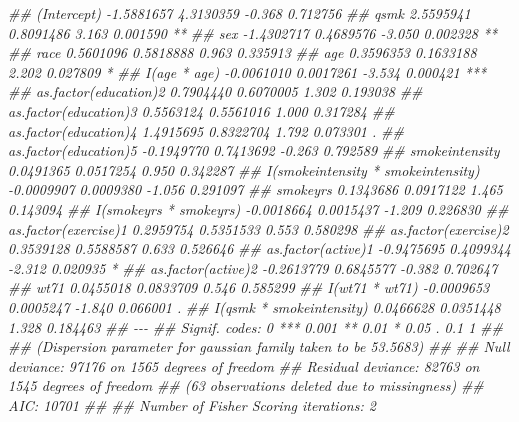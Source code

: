 \documentclass[
  10pt,
  a4paper,
]{book}
\newenvironment{Shaded}{\begin{snugshade}}{\end{snugshade}}
\newcommand{\DocumentationTok}[1]{\textcolor[rgb]{0.37,0.37,0.37}{\textit{#1}}}
\begin{document}
\begin{Shaded}
\begin{Highlighting}[]
\DocumentationTok{\#\# (Intercept)                        {-}1.5881657  4.3130359  {-}0.368 0.712756    }
\DocumentationTok{\#\# qsmk                                2.5595941  0.8091486   3.163 0.001590 ** }
\DocumentationTok{\#\# sex                                {-}1.4302717  0.4689576  {-}3.050 0.002328 ** }
\DocumentationTok{\#\# race                                0.5601096  0.5818888   0.963 0.335913    }
\DocumentationTok{\#\# age                                 0.3596353  0.1633188   2.202 0.027809 *  }
\DocumentationTok{\#\# I(age * age)                       {-}0.0061010  0.0017261  {-}3.534 0.000421 ***}
\DocumentationTok{\#\# as.factor(education)2               0.7904440  0.6070005   1.302 0.193038    }
\DocumentationTok{\#\# as.factor(education)3               0.5563124  0.5561016   1.000 0.317284    }
\DocumentationTok{\#\# as.factor(education)4               1.4915695  0.8322704   1.792 0.073301 .  }
\DocumentationTok{\#\# as.factor(education)5              {-}0.1949770  0.7413692  {-}0.263 0.792589    }
\DocumentationTok{\#\# smokeintensity                      0.0491365  0.0517254   0.950 0.342287    }
\DocumentationTok{\#\# I(smokeintensity * smokeintensity) {-}0.0009907  0.0009380  {-}1.056 0.291097    }
\DocumentationTok{\#\# smokeyrs                            0.1343686  0.0917122   1.465 0.143094    }
\DocumentationTok{\#\# I(smokeyrs * smokeyrs)             {-}0.0018664  0.0015437  {-}1.209 0.226830    }
\DocumentationTok{\#\# as.factor(exercise)1                0.2959754  0.5351533   0.553 0.580298    }
\DocumentationTok{\#\# as.factor(exercise)2                0.3539128  0.5588587   0.633 0.526646    }
\DocumentationTok{\#\# as.factor(active)1                 {-}0.9475695  0.4099344  {-}2.312 0.020935 *  }
\DocumentationTok{\#\# as.factor(active)2                 {-}0.2613779  0.6845577  {-}0.382 0.702647    }
\DocumentationTok{\#\# wt71                                0.0455018  0.0833709   0.546 0.585299    }
\DocumentationTok{\#\# I(wt71 * wt71)                     {-}0.0009653  0.0005247  {-}1.840 0.066001 .  }
\DocumentationTok{\#\# I(qsmk * smokeintensity)            0.0466628  0.0351448   1.328 0.184463    }
\DocumentationTok{\#\# {-}{-}{-}}
\DocumentationTok{\#\# Signif. codes:  0 \textquotesingle{}***\textquotesingle{} 0.001 \textquotesingle{}**\textquotesingle{} 0.01 \textquotesingle{}*\textquotesingle{} 0.05 \textquotesingle{}.\textquotesingle{} 0.1 \textquotesingle{} \textquotesingle{} 1}
\DocumentationTok{\#\# }
\DocumentationTok{\#\# (Dispersion parameter for gaussian family taken to be 53.5683)}
\DocumentationTok{\#\# }
\DocumentationTok{\#\#     Null deviance: 97176  on 1565  degrees of freedom}
\DocumentationTok{\#\# Residual deviance: 82763  on 1545  degrees of freedom}
\DocumentationTok{\#\#   (63 observations deleted due to missingness)}
\DocumentationTok{\#\# AIC: 10701}
\DocumentationTok{\#\# }
\DocumentationTok{\#\# Number of Fisher Scoring iterations: 2}


\end{Highlighting}
\end{Shaded}
\end{document}
